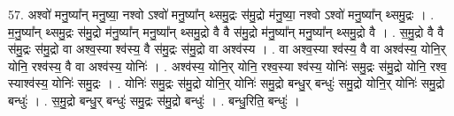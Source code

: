 \documentclass[17pt]{extarticle}
\begin{document}
57. अश्वो॑ मनु॒ष्या᳚न् मनु॒ष्या॒ नश्वो ऽश्वो॑ मनु॒ष्या᳚न् थ्समु॒द्रः स॑मु॒द्रो म॑नु॒ष्या॒ नश्वो ऽश्वो॑ मनु॒ष्या᳚न् थ्समु॒द्रः । . म॒नु॒ष्या᳚न् थ्समु॒द्रः स॑मु॒द्रो म॑नु॒ष्या᳚न् मनु॒ष्या᳚न् थ्समु॒द्रो वै वै स॑मु॒द्रो म॑नु॒ष्या᳚न् मनु॒ष्या᳚न् थ्समु॒द्रो वै । . स॒मु॒द्रो वै वै स॑मु॒द्रः स॑मु॒द्रो वा अश्व॒स्या श्व॑स्य॒ वै स॑मु॒द्रः स॑मु॒द्रो वा अश्व॑स्य । . वा अश्व॒स्या श्व॑स्य॒ वै वा अश्व॑स्य॒ योनि॒र् योनि॒ रश्व॑स्य॒ वै वा अश्व॑स्य॒ योनिः॑ । . अश्व॑स्य॒ योनि॒र् योनि॒ रश्व॒स्या श्व॑स्य॒ योनिः॑ समु॒द्रः स॑मु॒द्रो योनि॒ रश्व॒ स्याश्व॑स्य॒ योनिः॑ समु॒द्रः । . योनिः॑ समु॒द्रः स॑मु॒द्रो योनि॒र् योनिः॑ समु॒द्रो बन्धु॒र् बन्धुः॑ समु॒द्रो योनि॒र् योनिः॑ समु॒द्रो बन्धुः॑ । . स॒मु॒द्रो बन्धु॒र् बन्धुः॑ समु॒द्रः स॑मु॒द्रो बन्धुः॑ । . बन्धु॒रिति॒ बन्धुः॑ । \newline
\pagebreak
\end{document}
